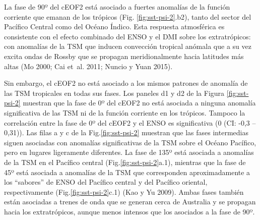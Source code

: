 \documentclass[12pt,oneside,a4paper]{reedthesis}
\begin{document}
La fase de 90º del cEOF2 está asociado a fuertes anomalías de la función corriente que emanan de los trópicos (Fig. \ref{fig:sst-psi-2}.b2), tanto del sector del Pacífico Central como del Océano Índico.
Esta respuesta atmosférica es consistente con el efecto combinado del ENSO y el DMI sobre los extratrópicos: con anomalías de la TSM que inducen convección tropical anómala que a su vez excita ondas de Rossby que se propagan meridionalmente hacia latitudes más altas (Mo 2000; Cai et~al. 2011; Nuncio y Yuan 2015).

Sin embargo, el cEOF2 no está asociado a los mismos patrones de anomalía de las TSM tropicales en todas sus fases.
Los paneles d1 y d2 de la Figura \ref{fig:sst-psi-2} muestran que la fase de 0º del cEOF2 no está asociada a ninguna anomalía significativa de las TSM ni de la función corriente en los trópicos.
Tampoco la correlación entre la fase de 0º del cEOF2 y el ENSO es significativa (0 (CI: -0,3 -- 0,31)).
Las filas a y c de la Fig.\ref{fig:sst-psi-2} muestran que las fases intermedias siguen asociadas con anomalías significativas de la TSM sobre el Océano Pacífico, pero en lugares ligeramente diferentes.
La fase de 135º está asociada a anomalías de la TSM en el Pacífico central (Fig.\ref{fig:sst-psi-2}a.1), mientras que la fase de 45º está asociada a anomalías de la TSM que corresponden aproximadamente a los ``sabores'' de ENSO del Pacífico central y del Pacífico oriental, respectivamente (Fig.\ref{fig:sst-psi-2}c.1) (Kao y Yu 2009).
Ambas fases también están asociadas a trenes de onda que se generan cerca de Australia y se propagan hacia los extratrópicos, aunque menos intensos que los asociados a la fase de 90º.
\end{document}
